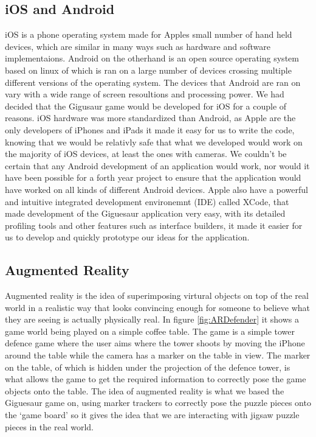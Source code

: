 \documentclass{article}
\begin{document}
\subsection{iOS and Android}
iOS is a phone operating system made for Apples small number of hand held devices, which are similar in many ways such as hardware and software implementaions. Android on the otherhand is an open source operating system based on linux of which is ran on a large number of devices crossing multiple different versions of the operating system. The devices that Android are ran on vary with a wide range of screen resoultions and processing power. We had decided that the Gigusaur game would be developed for iOS for a couple of reasons. iOS hardware was more standardized than Android, as Apple are the only developers of iPhones and iPads it made it easy for us to write the code, knowing that we would be relativly safe that what we developed would work on the majority of iOS devices, at least the ones with cameras. We couldn't be certain that any Android development of an application would work, nor would it have been possible for a forth year project to ensure that the application would have worked on all kinds of different Android devices. Apple also have a powerful and intuitive integrated development environemnt (IDE) called XCode, that made development of the Giguesaur application very easy, with its detailed profiling tools and other features such as interface builders, it made it easier for us to develop and quickly prototype our ideas for the application.

\subsection{Augmented Reality}
Augmented reality is the idea of superimposing virtural objects on top of the real world in a realistic way that looks convincing enough for someone to believe what they are seeing is actually physically real. In figure \ref{fig:ARDefender} it shows a game world being played on a simple coffee table. The game is a simple tower defence game where the user aims where the tower shoots by moving the iPhone around the table while the camera has a marker on the table in view. The marker on the table, of which is hidden under the projection of the defence tower, is what allows the game to get the required information to correctly pose the game objects onto the table. The idea of augmented reality is what we based the Giguesaur game on, using marker trackers to correctly pose the puzzle pieces onto the `game board' so it gives the idea that we are interacting with jigsaw puzzle pieces in the real world.
\end{document}
